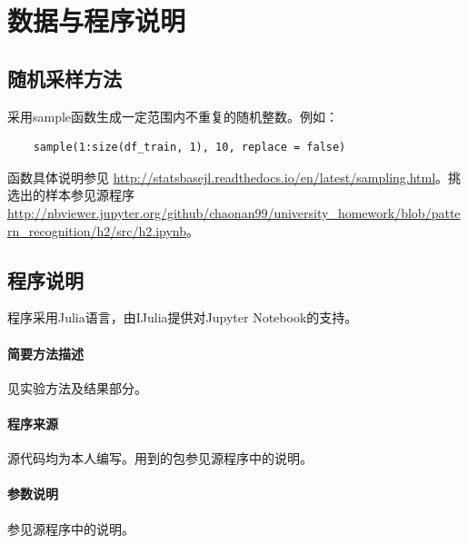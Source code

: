 \section{数据与程序说明}
\subsection{随机采样方法}
采用{\ttfamily sample}函数生成一定范围内不重复的随机整数。例如：
\begin{lstlisting}
	sample(1:size(df_train, 1), 10, replace = false)
\end{lstlisting}
函数具体说明参见 \url{http://statsbasejl.readthedocs.io/en/latest/sampling.html}。挑选出的样本参见源程序 \url{http://nbviewer.jupyter.org/github/chaonan99/university_homework/blob/pattern_recognition/h2/src/h2.ipynb}。

\subsection{程序说明}
程序采用{\ttfamily Julia}语言，由{\ttfamily IJulia}提供对{\ttfamily Jupyter Notebook}的支持。
\paragraph{简要方法描述} 见实验方法及结果部分。
\paragraph{程序来源} 源代码均为本人编写。用到的包参见源程序中的说明。
\paragraph{参数说明} 参见源程序中的说明。


